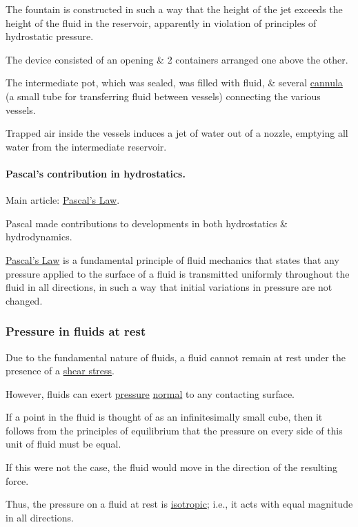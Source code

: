 \documentclass{article}
\begin{document}
The fountain is constructed in such a way that the height of the jet exceeds the height of the fluid in the reservoir, apparently in violation of principles of hydrostatic pressure.

The device consisted of an opening \& 2 containers arranged one above the other.

The intermediate pot, which was sealed, was filled with fluid, \& several \href{https://en.wikipedia.org/wiki/Cannula}{cannula} (a small tube for transferring fluid between vessels) connecting the various vessels.

Trapped air inside the vessels induces a jet of water out of a nozzle, emptying all water from the intermediate reservoir. 

\paragraph{Pascal's contribution in hydrostatics.} Main article: \href{https://en.wikipedia.org/wiki/Pascal's_Law}{Pascal's Law}.

%
Pascal made contributions to developments in both hydrostatics \& hydrodynamics.

\href{https://en.wikipedia.org/wiki/Pascal's_Law}{Pascal's Law} is a fundamental principle of fluid mechanics that states that any pressure applied to the surface of a fluid is transmitted uniformly throughout the fluid in all directions, in such a way that initial variations in pressure are not changed.

\subsubsection{Pressure in fluids at rest}
Due to the fundamental nature of fluids, a fluid cannot remain at rest under the presence of a \href{https://en.wikipedia.org/wiki/Shear_stress}{shear stress}.

However, fluids can exert \href{https://en.wikipedia.org/wiki/Pressure}{pressure} \href{https://en.wikipedia.org/wiki/Surface_normal}{normal} to any contacting surface.

If a point in the fluid is thought of as an infinitesimally small cube, then it follows from the principles of equilibrium that the pressure on every side of this unit of fluid must be equal.

If this were not the case, the fluid would move in the direction of the resulting force.

Thus, the pressure on a fluid at rest is \href{https://en.wikipedia.org/wiki/Isotropic}{isotropic}; i.e., it acts with equal magnitude in all directions.
\end{document}
